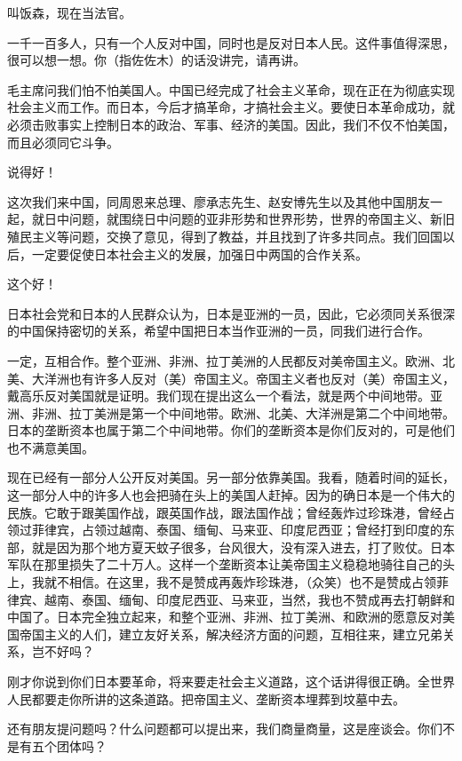 叫饭森，现在当法官。

一千一百多人，只有一个人反对中国，同时也是反对日本人民。这件事值得深思，很可以想一想。你（指佐佐木）的话没讲完，请再讲。

毛主席问我们怕不怕美国人。中国已经完成了社会主义革命，现在正在为彻底实现社会主义而工作。而日本，今后才搞革命，才搞社会主义。要使日本革命成功，就必须击败事实上控制日本的政治、军事、经济的美国。因此，我们不仅不怕美国，而且必须同它斗争。

说得好！

这次我们来中国，同周恩来总理、廖承志先生、赵安博先生以及其他中国朋友一起，就日中问题，就围绕日中问题的亚非形势和世界形势，世界的帝国主义、新旧殖民主义等问题，交换了意见，得到了教益，并且找到了许多共同点。我们回国以后，一定要促使日本社会主义的发展，加强日中两国的合作关系。

这个好！

日本社会党和日本的人民群众认为，日本是亚洲的一员，因此，它必须同关系很深的中国保持密切的关系，希望中国把日本当作亚洲的一员，同我们进行合作。

一定，互相合作。整个亚洲、非洲、拉丁美洲的人民都反对美帝国主义。欧洲、北美、大洋洲也有许多人反对（美）帝国主义。帝国主义者也反对（美）帝国主义，戴高乐反对美国就是证明。我们现在提出这么一个看法，就是两个中间地带。亚洲、非洲、拉丁美洲是第一个中间地带。欧洲、北美、大洋洲是第二个中间地带。日本的垄断资本也属于第二个中间地带。你们的垄断资本是你们反对的，可是他们也不满意美国。

现在已经有一部分人公开反对美国。另一部分依靠美国。我看，随着时间的延长，这一部分人中的许多人也会把骑在头上的美国人赶掉。因为的确日本是一个伟大的民族。它敢于跟美国作战，跟英国作战，跟法国作战；曾经轰炸过珍珠港，曾经占领过菲律宾，占领过越南、泰国、缅甸、马来亚、印度尼西亚；曾经打到印度的东部，就是因为那个地方夏天蚊子很多，台风很大，没有深入进去，打了败仗。日本军队在那里损失了二十万人。这样一个垄断资本让美帝国主义稳稳地骑往自己的头上，我就不相信。在这里，我不是赞成再轰炸珍珠港，（众笑）也不是赞成占领菲律宾、越南、泰国、缅甸、印度尼西亚、马来亚，当然，我也不赞成再去打朝鲜和中国了。日本完全独立起来，和整个亚洲、非洲、拉丁美洲、和欧洲的愿意反对美国帝国主义的人们，建立友好关系，解决经济方面的问题，互相往来，建立兄弟关系，岂不好吗？

刚才你说到你们日本要革命，将来要走社会主义道路，这个话讲得很正确。全世界人民都要走你所讲的这条道路。把帝国主义、垄断资本埋葬到坟墓中去。

还有朋友提问题吗？什么问题都可以提出来，我们商量商量，这是座谈会。你们不是有五个团体吗？

